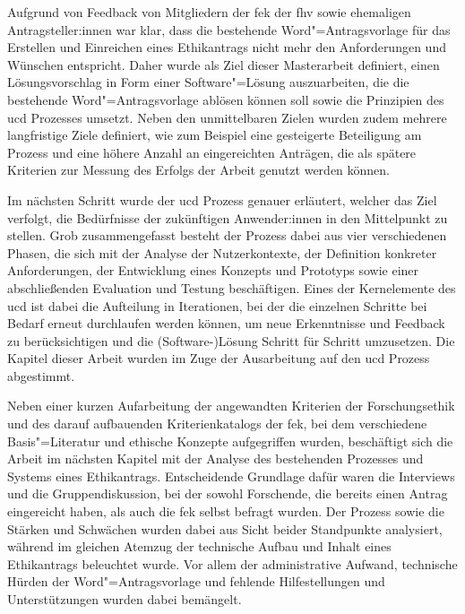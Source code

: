\documentclass[a4paper,12pt,twoside,numbers=noendperiod]{scrreprt}
\begin{document}
Aufgrund von Feedback von Mitgliedern der \ac{fek} der \ac{fhv} sowie ehemaligen Antragsteller:innen war klar, dass die bestehende Word"=Antragsvorlage für das Erstellen und Einreichen eines Ethikantrags nicht mehr den Anforderungen und Wünschen entspricht. Daher wurde als Ziel dieser Masterarbeit definiert, einen Lösungsvorschlag in Form einer Software"=Lösung auszuarbeiten, die die bestehende Word"=Antragsvorlage ablösen können soll sowie die Prinzipien des \acl{ucd} Prozesses umsetzt. Neben den unmittelbaren Zielen wurden zudem mehrere langfristige Ziele definiert, wie zum Beispiel eine gesteigerte Beteiligung am Prozess und eine höhere Anzahl an eingereichten Anträgen, die als spätere Kriterien zur Messung des Erfolgs der Arbeit genutzt werden können.

\medskip

Im nächsten Schritt wurde der \ac{ucd} Prozess genauer erläutert, welcher das Ziel verfolgt, die Bedürfnisse der zukünftigen Anwender:innen in den Mittelpunkt zu stellen. Grob zusammengefasst besteht der Prozess dabei aus vier verschiedenen Phasen, die sich mit der Analyse der Nutzerkontexte, der Definition konkreter Anforderungen, der Entwicklung eines Konzepts und Prototyps sowie einer abschließenden Evaluation und Testung beschäftigen. Eines der Kernelemente des \ac{ucd} ist dabei die Aufteilung in Iterationen, bei der die einzelnen Schritte bei Bedarf erneut durchlaufen werden können, um neue Erkenntnisse und Feedback zu berücksichtigen und die (Software-)Lösung Schritt für Schritt umzusetzen. Die Kapitel dieser Arbeit wurden im Zuge der Ausarbeitung auf den \ac{ucd} Prozess abgestimmt.

\medskip

Neben einer kurzen Aufarbeitung der angewandten Kriterien der Forschungsethik und des darauf aufbauenden Kriterienkatalogs der \ac{fek}, bei dem verschiedene Basis"=Literatur und ethische Konzepte aufgegriffen wurden, beschäftigt sich die Arbeit im nächsten Kapitel mit der Analyse des bestehenden Prozesses und Systems eines Ethikantrags. Entscheidende Grundlage dafür waren die Interviews und die Gruppendiskussion, bei der sowohl Forschende, die bereits einen Antrag eingereicht haben, als auch die \acl{fek} selbst befragt wurden. Der Prozess sowie die Stärken und Schwächen wurden dabei aus Sicht beider Standpunkte analysiert, während im gleichen Atemzug der technische Aufbau und Inhalt eines Ethikantrags beleuchtet wurde. Vor allem der administrative Aufwand, technische Hürden der Word"=Antragsvorlage und fehlende Hilfestellungen und Unterstützungen wurden dabei bemängelt.
\end{document}

